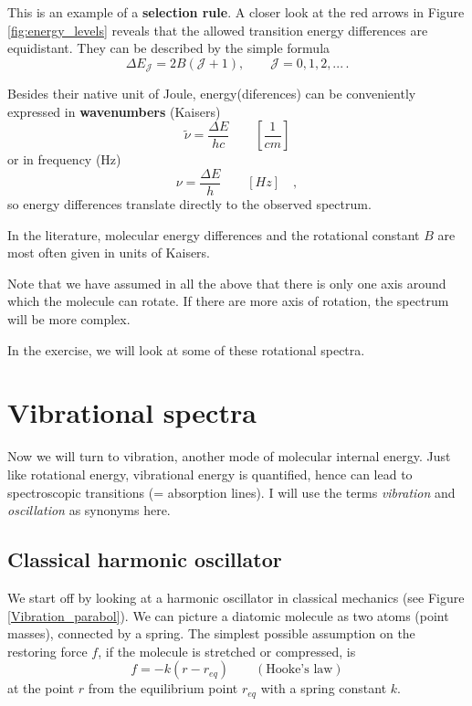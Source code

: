 This is an example of a \textbf{selection rule}. A closer look at the
red arrows in Figure \ref{fig:energy_levels} reveals that the allowed
transition energy differences are equidistant. They can be described
by the simple formula
\begin{equation}
\Delta E_\mathcal{J} = 2B(\mathcal{J}+1), \qquad \mathcal{J} = 0, 1, 2, ...\,.
\end{equation}

Besides their native unit of Joule,
energy(diferences) can be conveniently expressed in
\textbf{wavenumbers} (Kaisers)
\begin{equation}
\tilde{\nu} = \frac{\Delta E}{hc} \qquad \left[\frac{1}{cm}\right]
\end{equation}
or in frequency (Hz)
\begin{equation}
\nu = \frac{\Delta E}{h} \qquad \left[Hz\right] \quad ,
\end{equation}
so energy differences translate directly to the observed spectrum.

In the literature, molecular energy differences and the rotational
constant $B$ are most often given in
units of Kaisers.

Note that we have assumed in all the above that there is only one
axis around which the molecule can rotate. If there are more axis of
rotation, the spectrum will be more complex.

In the exercise, we will look at some of these rotational spectra.


\clearpage
\section{Vibrational spectra}
Now we will turn to vibration, another mode of molecular internal
energy. Just like rotational energy, vibrational energy is quantified,
hence can lead to spectroscopic transitions (= absorption lines). I
will use the terms \emph{vibration} and \emph{oscillation} as synonyms here.

\subsection{Classical harmonic oscillator}
We start off by looking at a harmonic oscillator in classical
mechanics (see Figure \ref{Vibration_parabol}). We can picture a
diatomic molecule as two atoms (point masses), connected by a
spring. The simplest possible assumption on the restoring force $f$, if
the molecule is stretched or compressed, is 
\begin{equation}
\label{eq:hooke}
f = -k (r-r_{eq}) \qquad (\text{Hooke's law})
\end{equation}
at the point $r$ from the equilibrium point $r_{eq}$ with a spring
constant $k$. 

